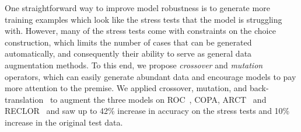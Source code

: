 

One straightforward way to improve model robustness is to generate more 
training examples which look like the stress tests that the model is struggling with. 
However, many of the stress tests come with constraints on the choice
construction, which limits the number of cases that can be generated
automatically, and consequently their ability to serve as general 
data augmentation methods. To this end, we propose \textit{crossover} and 
\textit{mutation} operators, which can easily generate abundant data and 
encourage models to pay more attention to the premise. 
We applied crossover, mutation, and back-translation~\cite{back2019} 
to augment the three models on ROC~\cite{roc2017}, COPA, 
ARCT~\cite{arct2018} and RECLOR~\cite{yu2020reclor} and saw
up to 42\% increase in accuracy on the stress tests and 10\% increase in
the original test data.

